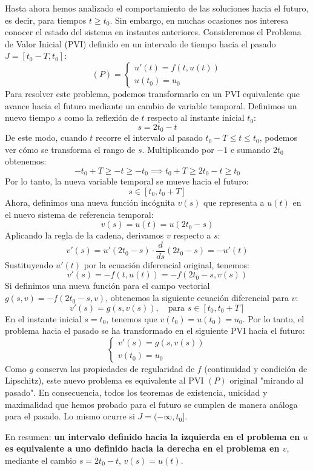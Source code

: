Hasta ahora hemos analizado el comportamiento de las soluciones hacia el futuro, es decir, para tiempos $t \geq t_0$. Sin embargo, en muchas ocasiones nos interesa conocer el estado del sistema en instantes anteriores. Consideremos el Problema de Valor Inicial (PVI) definido en un intervalo de tiempo hacia el pasado $J = [t_0 - T, t_0]$:
\[
    (P) = 
    \begin{cases}
        u'(t) = f(t, u(t)) \\
        u(t_0) = u_0
    \end{cases}
\]
Para resolver este problema, podemos transformarlo en un PVI equivalente que avance hacia el futuro mediante un cambio de variable temporal. Definimos un nuevo tiempo $s$ como la reflexión de $t$ respecto al instante inicial $t_0$:
\[
    s = 2t_0 - t 
\]
De este modo, cuando $t$ recorre el intervalo al pasado $t_0 - T \leq t \leq t_0$, podemos ver cómo se transforma el rango de $s$. Multiplicando por $-1$ e sumando $2t_0$ obtenemos:
\[
    -t_0 + T \geq -t \geq -t_0 \implies t_0 + T \geq 2t_0 - t \geq t_0
\]
Por lo tanto, la nueva variable temporal se mueve hacia el futuro:
\[
    s \in [t_0, t_0 + T]
\]
Ahora, definimos una nueva función incógnita $v(s)$ que representa a $u(t)$ en el nuevo sistema de referencia temporal:
\[
    v(s) = u(t) = u(2t_0 - s)
\]
Aplicando la regla de la cadena, derivamos $v$ respecto a $s$:
\[
    v'(s) = u'(2t_0 - s) \cdot \frac{d}{ds}(2t_0 - s) = - u'(t)
\]
Sustituyendo $u'(t)$ por la ecuación diferencial original, tenemos:
\[
    v'(s) = - f(t, u(t)) = - f(2t_0 - s, v(s))
\]
Si definimos una nueva función para el campo vectorial $g(s, v) = - f(2t_0 - s, v)$, obtenemos la siguiente ecuación diferencial para $v$:
\[
    v'(s) = g(s, v(s)), \quad \text{para } s \in [t_0, t_0 + T]
\]
En el instante inicial $s = t_0$, tenemos que $v(t_0) = u(t_0) = u_0$. Por lo tanto, el problema hacia el pasado se ha transformado en el siguiente PVI hacia el futuro:
\[
    \begin{cases}
        v'(s) = g(s, v(s)) \\
        v(t_0) = u_0
    \end{cases}
\]
Como $g$ conserva las propiedades de regularidad de $f$ (continuidad y condición de Lipschitz), este nuevo problema es equivalente al PVI $(P)$ original "mirando al pasado". En consecuencia, todos los teoremas de existencia, unicidad y maximalidad que hemos probado para el futuro se cumplen de manera análoga para el pasado. Lo mismo ocurre si $J = (-\infty, t_0]$.

En resumen: \textbf{un intervalo definido hacia la izquierda en el problema en $u$ es equivalente a uno definido hacia la derecha en el problema en $v$}, mediante el cambio $s = 2t_0 - t$, $v(s) = u(t)$.

